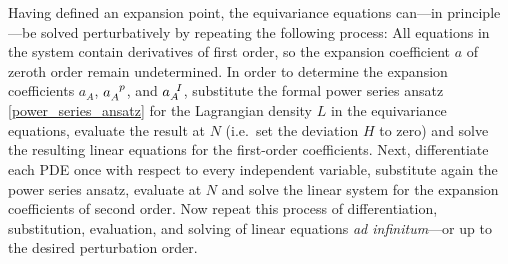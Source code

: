 Having defined an expansion point, the equivariance equations can---in principle---be solved perturbatively by repeating the following process: All equations in the system contain derivatives of first order, so the expansion coefficient $a$ of zeroth order remain undetermined. In order to determine the expansion coefficients $a_A$, $a_A^{\hphantom Ap}$, and $a_A^{\hphantom aI}$, substitute the formal power series ansatz \eqref{power_series_ansatz} for the Lagrangian density $L$ in the equivariance equations, evaluate the result at $N$ (i.e.~set the deviation $H$ to zero) and solve the resulting linear equations for the first-order coefficients. Next, differentiate each PDE once with respect to every independent variable, substitute again the power series ansatz, evaluate at $N$ and solve the linear system for the expansion coefficients of second order. Now repeat this process of differentiation, substitution, evaluation, and solving of linear equations \emph{ad infinitum}---or up to the desired perturbation order.

